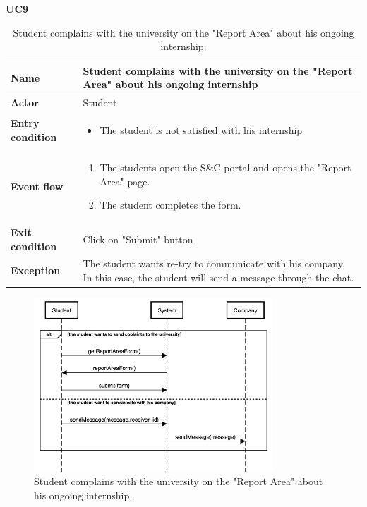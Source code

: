     \textbf{UC9}
    \nopagebreak
    \begin{table}[H]
        \centering
        \begin{tabular}{|l|p{11.9cm}|}
        \hline
        \textbf{Name}            & Student complains with the university on the "Report Area" about his ongoing internship \\\hline
        \textbf{Actor}           & Student    \\\hline
        \textbf{Entry condition} &
        \begin{itemize}
              \item The student is not satisfied with his internship
        \end{itemize}                                        \\\hline
        \textbf{Event flow}      &
        \begin{enumerate}[label=\arabic*.]
              \item The students open the S\&C portal and opens the "Report Area" page.
              \item The student completes the form.
        \end{enumerate}            \\\hline
        \textbf{Exit condition}  & Click on "Submit" button  \\\hline
        \textbf{Exception}       &  The student wants re-try to communicate with his company. In this case, the student will send a message through the chat.   \\\hline
        \end{tabular}
        \caption{Student complains with the university on the "Report Area" about his ongoing internship.}
        \label{table:Student complains with the university on the "Report Area" about his ongoing internship}
    \end{table}

    \begin{figure}[H]
        \centering
        \includegraphics[width=0.8\textwidth]{RASD/Assets/SequenceDiagrams/9-student-sends-a-complaint.png}
        \caption{Student complains with the university on the "Report Area" about his ongoing internship.}
        \label{fig:Student complains with the university on the "Report Area" about his ongoing internship}
    \end{figure}

